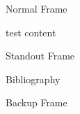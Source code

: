 \documentclass{beamer}
\begin{document}
\begin{frame}
    \maketitle
\end{frame}

\begin{frame}{Normal Frame}
    \begin{block}{test}
        content
    \end{block}
\end{frame}

\begin{frame}[standout]
    Standout Frame
\end{frame}


\begin{frame}[allowframebreaks]{Bibliography}
    \printbibliography[heading=none]
\end{frame}

\appendix

\begin{frame}{Backup Frame}
\end{frame}
\end{document}
